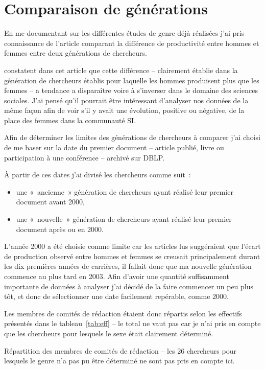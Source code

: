 	\section{Comparaison de générations}
		En me documentant sur les différentes études de genre déjà réalisées j'ai pris connaissance de l'article \citep*{van} comparant la différence de productivité entre hommes et femmes entre deux générations de chercheurs.
		
		\citet*{van} constatent dans cet article que cette différence -- clairement établie dans la génération de chercheurs établis pour laquelle les hommes produisent plus que les femmes -- a tendance a disparaître voire à s'inverser dans le domaine des sciences sociales. J'ai pensé qu'il pourrait être intéressant d'analyser nos données de la même façon afin de voir s'il y avait une évolution, positive ou négative, de la place des femmes dans la communauté SI.
	
		Afin de déterminer les limites des générations de chercheurs à comparer j'ai choisi de me baser sur la date du premier document -- article publié, livre ou participation à une conférence -- archivé sur DBLP.
		
		À partir de ces dates j'ai divisé les chercheurs comme suit~:
		\begin{itemize}
			\item une «~ancienne~» génération de chercheurs ayant réalisé leur premier document avant 2000,
			\item une «~nouvelle~» génération de chercheurs ayant réalisé leur premier document après ou en 2000.
		\end{itemize}
		
		L'année 2000 a été choisie comme limite car les articles lus suggéraient que l'écart de production observé entre hommes et femmes se creusait principalement durant les dix premières années de carrières, il fallait donc que ma nouvelle génération commence au plus tard en 2003. Afin d'avoir une quantité suffisamment importante de données à analyser j'ai décidé de la faire commencer un peu plus tôt, et donc de sélectionner une date facilement repérable, comme 2000.
		
		Les  membres de comités de rédaction étaient donc répartis selon les effectifs présentés dans le tableau~\ref{tab:eff} -- le total ne vaut pas  car je n'ai pris en compte que les chercheurs pour lesquels le sexe était clairement déterminé.
		
		\begin{table}[ht]
			\centering
			\caption{Répartition des membres de comités de rédaction -- les 26 chercheurs pour lesquels le genre n'a pas pu être déterminé ne sont pas pris en compte ici.}\label{tab:eff}
			
		\end{table}
		
